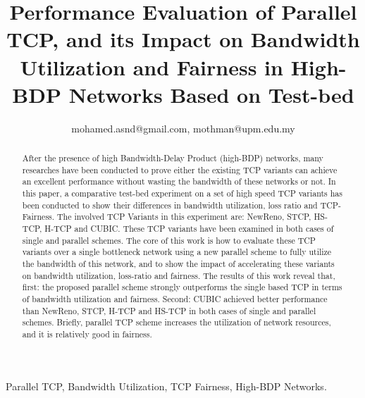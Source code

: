 \documentclass[a4paper, conference]{IEEEtran}
\begin{document}
\title{Performance Evaluation of Parallel TCP, and its Impact on Bandwidth Utilization and Fairness in  High-BDP Networks Based on Test-bed}



\author{
mohamed.asnd@gmail.com, mothman@upm.edu.my}

\maketitle



\begin{abstract}
After the presence of high Bandwidth-Delay Product (high-BDP) networks, many researches have been conducted to prove either the existing TCP variants can achieve an excellent performance without wasting the bandwidth of these networks or not. In this paper, a comparative test-bed experiment on a set of high speed TCP variants has been conducted to show their differences in bandwidth utilization, loss ratio and TCP-Fairness. The involved TCP Variants in this experiment are: NewReno, STCP, HS-TCP, H-TCP and CUBIC. These TCP variants have been examined in both cases of single and parallel schemes. The core of this work is how to evaluate these TCP variants over a single bottleneck network using a new parallel scheme to fully utilize the bandwidth of this network, and to show the impact of accelerating these variants on bandwidth utilization, loss-ratio and fairness. The results of this work reveal that, first: the proposed parallel scheme strongly outperforms the single based TCP in terms of bandwidth utilization and fairness. Second: CUBIC achieved better performance than NewReno, STCP, \mbox{H-TCP} and HS-TCP in both cases of single and parallel schemes. Briefly, parallel TCP scheme increases the utilization of network resources, and it is relatively good in fairness.
\end{abstract}

\vspace{0.25cm}

\begin{IEEEkeywords}
Parallel TCP, Bandwidth Utilization, TCP Fairness, High-BDP Networks.
\end{IEEEkeywords}
\end{document}
